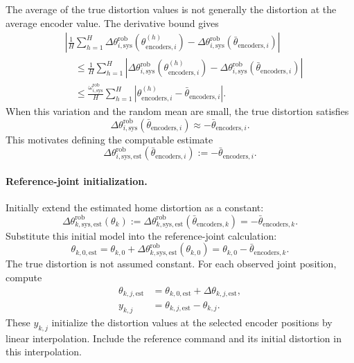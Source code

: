 \documentclass[../main.tex]{subfiles}
\begin{document}
The average of the true distortion values is not generally the distortion at the average encoder value. The derivative bound gives
\begin{equation*}
\begin{aligned}
&\left|\frac1H\sum_{h=1}^{H}\Delta\theta^{\mathrm{rob}}_{i,\mathrm{sys}}(\theta_{\mathrm{encoders},i}^{(h)})
-\Delta\theta^{\mathrm{rob}}_{i,\mathrm{sys}}(\bar\theta_{\mathrm{encoders},i})\right|\\
&\quad\leq\frac1H\sum_{h=1}^{H}
\left|\Delta\theta^{\mathrm{rob}}_{i,\mathrm{sys}}(\theta_{\mathrm{encoders},i}^{(h)})
-\Delta\theta^{\mathrm{rob}}_{i,\mathrm{sys}}(\bar\theta_{\mathrm{encoders},i})\right|\\
&\quad\leq\frac{\omega^{\mathrm{rob}}_{i,\mathrm{sys}}}{H}
\sum_{h=1}^{H}\left|\theta_{\mathrm{encoders},i}^{(h)}-\bar\theta_{\mathrm{encoders},i}\right|.
\end{aligned}
\end{equation*}
When this variation and the random mean are small, the true distortion satisfies
\begin{equation*}
\Delta\theta^{\mathrm{rob}}_{i,\mathrm{sys}}(\bar\theta_{\mathrm{encoders},i})
\approx-\bar\theta_{\mathrm{encoders},i}.
\end{equation*}
This motivates defining the computable estimate
\begin{equation}\label{eq:home-distortion}
\Delta\theta^{\mathrm{rob}}_{i,\mathrm{sys},\mathrm{est}}
(\bar\theta_{\mathrm{encoders},i}):=-\bar\theta_{\mathrm{encoders},i}.
\end{equation}

\paragraph{Reference-joint initialization.}
Initially extend the estimated home distortion as a constant:
\begin{equation*}
\Delta\theta^{\mathrm{rob}}_{k,\mathrm{sys},\mathrm{est}}(\theta_k)
:=\Delta\theta^{\mathrm{rob}}_{k,\mathrm{sys},\mathrm{est}}(\bar\theta_{\mathrm{encoders},k})
=-\bar\theta_{\mathrm{encoders},k}.
\end{equation*}
Substitute this initial model into the reference-joint calculation:
\begin{equation*}
\theta_{k,0,\mathrm{est}}
=\theta_{k,0}+\Delta\theta^{\mathrm{rob}}_{k,\mathrm{sys},\mathrm{est}}(\theta_{k,0})
=\theta_{k,0}-\bar\theta_{\mathrm{encoders},k}.
\end{equation*}
The true distortion is not assumed constant. For each observed joint position, compute
\begin{equation}\label{eq:stepA-y}
\begin{aligned}
\theta_{k,j,\mathrm{est}}&=\theta_{k,0,\mathrm{est}}+\Delta\theta_{k,j,\mathrm{est}},\\
y_{k,j}&=\theta_{k,j,\mathrm{est}}-\theta_{k,j}.
\end{aligned}
\end{equation}
These $y_{k,j}$ initialize the distortion values at the selected encoder positions by linear interpolation. Include the reference command and its initial distortion in this interpolation.
\end{document}
